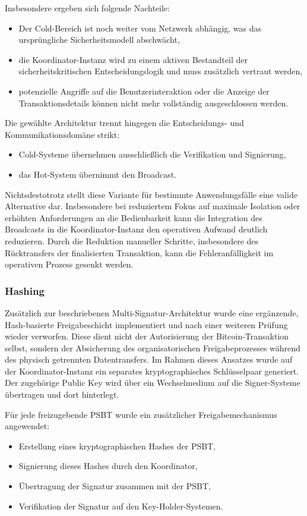 Insbesondere ergeben sich folgende Nachteile:
\begin{itemize}
    \item Der Cold-Bereich ist noch weiter vom Netzwerk abhängig, was das ursprüngliche Sicherheitsmodell abschwächt,
    \item die Koordinator-Instanz wird zu einem aktiven Bestandteil der sicherheitskritischen Entscheidungslogik und muss zusätzlich vertraut werden,
    \item potenzielle Angriffe auf die Benutzerinteraktion oder die Anzeige der Transaktionsdetails können nicht mehr vollständig ausgeschlossen werden.
\end{itemize}

Die gewählte Architektur trennt hingegen die Entscheidungs- und Kommunikationsdomäne strikt:
\begin{itemize}
    \item Cold-Systeme übernehmen ausschließlich die Verifikation und Signierung,
    \item das Hot-System übernimmt den Broadcast.
\end{itemize}

Nichtsdestotrotz stellt diese Variante für bestimmte Anwendungsfälle eine valide Alternative dar.
Insbesondere bei reduziertem Fokus auf maximale Isolation oder erhöhten Anforderungen an die Bedienbarkeit kann die Integration des Broadcasts in die Koordinator-Instanz den operativen Aufwand deutlich reduzieren. Durch die Reduktion manueller Schritte, insbesondere des Rücktransfers der finalisierten Transaktion, kann die Fehleranfälligkeit im operativen Prozess gesenkt werden.

\subsubsection{Hashing} \label{sec:alt_hash}
Zusätzlich zur beschriebenen Multi-Signatur-Architektur wurde eine ergänzende, Hash-basierte Freigabeschicht implementiert und nach einer weiteren Prüfung wieder verworfen. Diese dient nicht der Autorisierung der Bitcoin-Transaktion selbst, sondern der Absicherung des organisatorischen Freigabeprozesses während des physisch getrennten Datentransfers.
Im Rahmen dieses Ansatzes wurde auf der Koordinator-Instanz ein separates kryptographisches Schlüsselpaar generiert. Der zugehörige Public Key wird über ein Wechselmedium auf die Signer-Systeme übertragen und dort hinterlegt.

Für jede freizugebende \ac{PSBT} wurde ein zusätzlicher Freigabemechanismus angewendet:
\begin{itemize}
    \item Erstellung eines kryptographischen Hashes der \ac{PSBT},
    \item Signierung dieses Hashes durch den Koordinator,
    \item Übertragung der Signatur zusammen mit der \ac{PSBT},
    \item Verifikation der Signatur auf den Key-Holder-Systemen.
\end{itemize}

